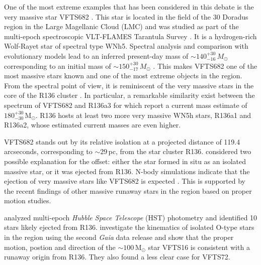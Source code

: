 \documentclass[apjl,twocolumn]{emulateapj}
\newcommand{\Msun}{{\,\mathrm{M}_\odot}}
\begin{document}
One of the most extreme examples that has been considered in this debate is the very massive star VFTS682  \citep[][]{bestenlehner:11, bressert:12}. This star is located in the field of the 30 Doradus region in the Large Magellanic Cloud (LMC) and was studied as part of the multi-epoch spectroscopic VLT-FLAMES Tarantula Survey \citep[VFTS,][]{evans:11}. It is a hydrogen-rich Wolf-Rayet star of spectral type WNh5. Spectral analysis and comparison with evolutionary models lead to an inferred present-day mass of $\sim$$140^{+30}_{-16}\,M_\odot$ corresponding to an initial mass of $\sim$$150^{+30}_{-17}\,M_\odot$
\citep{schneider:18}. 
%
%
This makes VFTS682 one of the most massive stars known and one of the most extreme objects in the region.
%
From the spectral point of view, it is reminiscent of the very
massive stars %
 in the core of the R136 cluster \citep{dekoter:97,crowther:10, crowther:16}. 
 In particular, a remarkable similarity exist between the
spectrum of VFTS682 and R136a3 \citep{rubio-diez:17} for which \citet{crowther:16} report a
current mass estimate of $180^{+30}_{-30}\Msun$. R136 hosts
at least two more very massive WN5h stars, R136a1 and R136a2, whose
estimated current masses are even higher. 


VFTS682 stands out by its relative isolation at a projected distance of 119.4 arcseconds, corresponding to 
$\sim$$29$\,pc, from  the star cluster R136. \citet{bestenlehner:11}
considered two possible explanation for the offset: either
the star formed in situ as an isolated massive star, %
or it was ejected from  R136. N-body simulations %
indicate that the ejection of very massive stars like VFTS682 is
expected \citep[e.g.][]{fujii:11, banerjee:12}.  This is supported by
the recent findings of other massive runaway stars in the region based
on proper motion studies.

\citet{platais:15,platais:18} analyzed multi-epoch \emph{Hubble Space
  Telescope} (HST) photometry and identified 10 stars likely ejected
from R136.   \citet{lennon:18} investigate the kinematics of  isolated
O-type stars in the region using the second \emph{Gaia} data release
\cite[DR2,][]{gaia:16,brown:18} and show that the proper motion,
postion and direction of the $\sim100\Msun$ star VFTS16 is consistent
with a runaway origin from R136. They also found a less clear case for VFTS72. 
\end{document}
